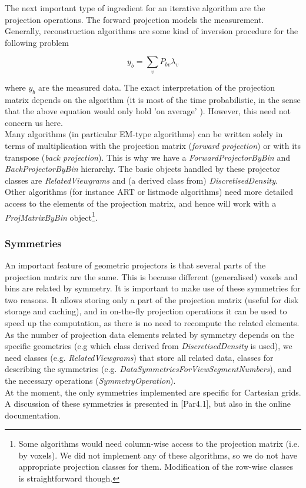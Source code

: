 \documentclass{article}
\begin{document}
The next important type of ingredient for an iterative algorithm 
are the projection operations. The forward projection models 
the measurement. Generally, reconstruction algorithms are some 
kind of inversion procedure for the following problem


\[y_{b} =\sum\limits_{v}P_{bv} \lambda _{v}  \]


where $y_b$ are the measured data. The exact interpretation 
of the projection matrix depends on the algorithm (it is most 
of the time probabilistic, in the sense that the above equation 
would only hold 'on average' ). However, this need not concern 
us here.\\
Many algorithms (in particular EM-type algorithms) can be written 
solely in terms of multiplication with the projection matrix 
(\textit{forward projection}) or with its transpose (\textit{back projection}). 
This is why we have a \textit{ForwardProjectorByBin} and \textit{BackProjectorByBin} 
hierarchy. The basic objects handled by these projector classes 
are \textit{RelatedViewgrams} and (a derived class from) \textit{DiscretisedDensity}. 
Other algorithms (for instance ART or listmode algorithms) need 
more detailed access to the elements of the projection matrix, 
and hence will work with a \textit{ProjMatrixByBin} object\footnote{{\small Some 
algorithms would need column-wise access to the projection matrix 
(i.e. by voxels). We did not implement any of these algorithms, 
so we do not have appropriate projection classes for them. Modification 
of the row-wise classes is straightforward though.}}. 


\subsubsection{
Symmetries \label{sect:sect:symmetries}}

An important feature of geometric projectors is that several 
parts of the projection matrix are the same. This is because 
different (generalised) voxels and bins are related by symmetry. 
It is important to make use of these symmetries for two reasons. 
It allows storing only a part of the projection matrix (useful 
for disk storage and caching), and in on-the-fly projection operations 
it can be used to speed up the computation, as there is no need 
to recompute the related elements. As the number of projection 
data elements related by symmetry depends on the specific geometries 
(e.g which class derived from \textit{DiscretisedDensity} is used), 
we need classes (e.g. \textit{RelatedViewgrams}) that store all related 
data, classes for describing the symmetries (e.g. \textit{DataSymmetriesForViewSegmentNumbers}), 
and the necessary operations (\textit{SymmetryOperation}). \\
At the moment, the only symmetries implemented are specific for 
Cartesian grids. A discussion of these symmetries is presented 
in [Par4.1], but also in the online documentation.
\end{document}
